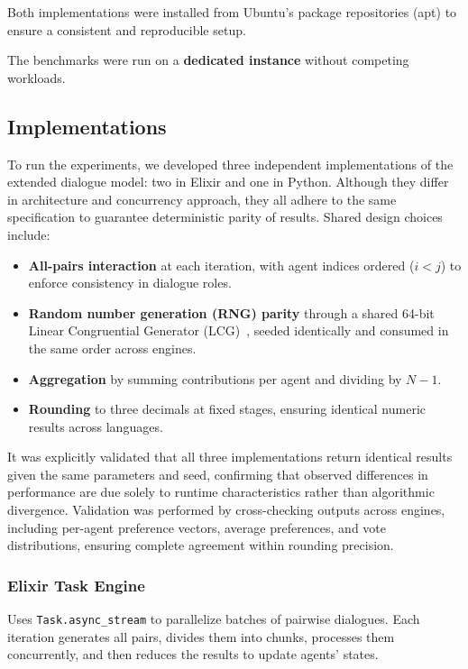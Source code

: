 \documentclass[
]{ceurart}
\begin{document}
Both implementations were installed from Ubuntu’s package repositories (apt) to ensure a consistent and reproducible setup.


The benchmarks were run on a \textbf{dedicated instance} without competing workloads.

\subsection{Implementations}
To run the experiments, we developed three independent implementations of the extended dialogue model: two in Elixir and one in Python. Although they differ in architecture and concurrency approach, they all adhere to the same specification to guarantee deterministic parity of results. Shared design choices include:

\begin{itemize}
	\item \textbf{All-pairs interaction} at each iteration, with agent indices ordered ($i < j$) to enforce consistency in dialogue roles.
	\item \textbf{Random number generation (RNG) parity} through a shared 64-bit Linear Congruential Generator (LCG)~\cite{Thomson1958}, seeded identically and consumed in the same order across engines.
	\item \textbf{Aggregation} by summing contributions per agent and dividing by $N-1$.
	\item \textbf{Rounding} to three decimals at fixed stages, ensuring identical numeric results across languages.
\end{itemize}

It was explicitly validated that all three implementations return identical results given the same parameters and seed, confirming that observed differences in performance are due solely to runtime characteristics rather than algorithmic divergence. Validation was performed by cross-checking outputs across engines, including per-agent preference vectors, average preferences, and vote distributions, ensuring complete agreement within rounding precision.

\subsubsection{Elixir Task Engine}
Uses \verb|Task.async_stream| to parallelize batches of pairwise dialogues. Each iteration generates all pairs, divides them into chunks, processes them concurrently, and then reduces the results to update agents' states.
\end{document}
